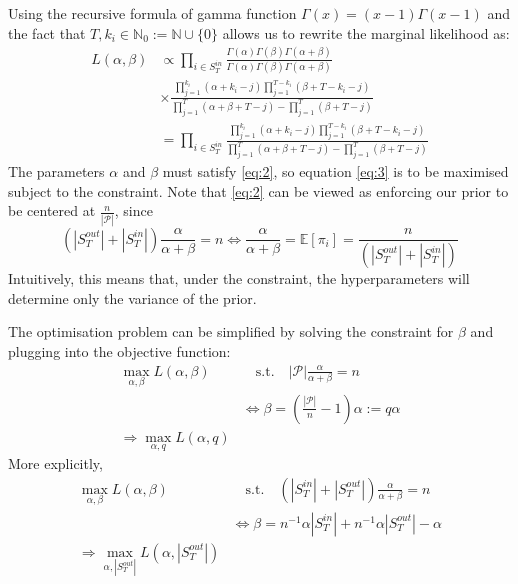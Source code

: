 \documentclass[a4paper, 12pt]{article}
\newcommand{\sout}{|S^{out}_T|}
\newcommand{\sint}{|S^{in}_T|}
\newcommand{\pop}{|\mathcal{P}|}
\begin{document}
Using the recursive formula of gamma function $\Gamma(x) = (x - 1)\Gamma(x - 1)$ and the fact that $T, k_i \in \mathbb{N}_0 := \mathbb{N} \cup \{0\}$ allows us to rewrite the marginal likelihood as:
\begin{align*}
    L(\alpha, \beta) &\propto \prod_{i \in S_T^{in}} \frac{\Gamma(\alpha) \Gamma(\beta) \Gamma(\alpha + \beta)}{\Gamma(\alpha)\Gamma(\beta)\Gamma(\alpha + \beta)}\\
    &\times \frac{\prod_{j=1}^{k_i} (\alpha + k_i - j)\prod_{j=1}^{T - k_i} (\beta + T - k_i - j)}{\prod_{j=1}^T(\alpha + \beta + T - j) - \prod_{j=1}^T (\beta + T - j)} \\
    &= \prod_{i \in S_T^{in}} \frac{\prod_{j=1}^{k_i} (\alpha + k_i - j)\prod_{j=1}^{T - k_i} (\beta + T - k_i - j)}{\prod_{j=1}^T(\alpha + \beta + T - j) - \prod_{j=1}^T (\beta + T - j)} 
\end{align*}
The parameters $\alpha$ and $\beta$ must satisfy \eqref{eq:2}, so equation \eqref{eq:3} is to be maximised subject to the constraint. Note that \eqref{eq:2} can be viewed as enforcing our prior to be centered at $\frac{n}{\pop}$, since 
\begin{equation*}
(|S_T^{out}| + |S_T^{in}|) \frac{\alpha}{\alpha + \beta} = n \Leftrightarrow \frac{\alpha}{\alpha + \beta} = \mathbb{E}[\pi_i] = \frac{n}{(|S_T^{out}| + |S_T^{in}|)}
\end{equation*}
Intuitively, this means that, under the constraint, the hyperparameters will determine only the variance of the prior.

The optimisation problem can be simplified by solving the constraint for $\beta$ and plugging into the objective function:
\begin{align*}
    \max_{\alpha, \beta} L(\alpha, \beta) &\quad \text{s.t.} \quad |\mathcal{P}|\frac{\alpha}{\alpha + \beta} = n \\
    &\Leftrightarrow \beta = \left(\frac{|\mathcal{P}|}{n} - 1 \right)\alpha := q\alpha\\
    \Rightarrow \max_{\alpha, q} L(\alpha, q) &
\end{align*}
More explicitly,
\begin{align*}
    \max_{\alpha, \beta} L(\alpha, \beta) &\quad \text{s.t.} \quad (\sint + \sout)\frac{\alpha}{\alpha + \beta} = n \\
    &\Leftrightarrow \beta = n^{-1}\alpha\sint + n^{-1}\alpha\sout - \alpha\\
    \Rightarrow \max_{\alpha, \sout} L(\alpha, \sout) &
\end{align*}
\end{document}
